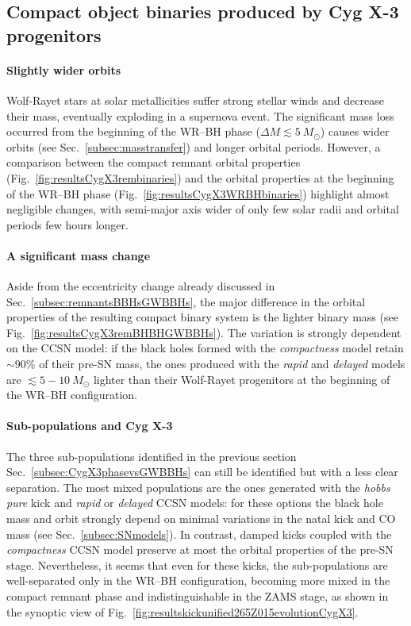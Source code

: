 \documentclass[a4paper,titlepage]{book}     	%
\newcommand{\sun}{\ensuremath{_\odot}}
\newcommand{\msun}{\ensuremath{M\sun}}
\begin{document}
\subsection{Compact object binaries produced by Cyg X-3 progenitors}\label{subsec:RemnantsCygX3vsGWBBHs}
\paragraph{Slightly wider orbits} Wolf-Rayet stars at solar metallicities suffer strong stellar winds and decrease their mass, eventually exploding in a supernova event. The significant mass loss occurred from the beginning of the WR--BH phase ($\Delta M \lesssim 5~\msun$) causes wider orbits (see Sec.\ \ref{subsec:masstransfer}) and longer orbital periods. However, a comparison between the compact remnant orbital properties (Fig.\ \ref{fig:resultsCygX3rembinaries}) and the orbital properties at the beginning of the WR--BH phase (Fig.\ \ref{fig:resultsCygX3WRBHbinaries}) highlight almost negligible changes, with semi-major axis wider of only few solar radii and orbital periods few hours longer. 



\paragraph{A significant mass change} Aside from the eccentricity change already discussed in Sec.\ \ref{subsec:remnantsBBHsGWBBHs}, the major difference in the orbital properties of the resulting compact binary system is the lighter binary mass (see Fig.\ \ref{fig:resultsCygX3remBHBHGWBBHs}). The variation is strongly dependent on the CCSN model: if the black holes formed with the \emph{compactness} model retain $\sim 90\%$ of their pre-SN mass, the ones produced with the \emph{rapid} and \emph{delayed} models are $\lesssim 5-10~\msun$ lighter than their Wolf-Rayet progenitors at the beginning of the WR--BH configuration.

\paragraph{Sub-populations and Cyg X-3} The three sub-populations identified in the previous section Sec.\ \ref{subsec:CygX3phasevsGWBBHs} can still be identified but with a less clear separation. The most mixed populations are the ones generated with the \emph{hobbs pure} kick and \emph{rapid} or \emph{delayed} CCSN models: for these options the black hole mass and orbit strongly depend on minimal variations in the natal kick and CO mass (see Sec.\ \ref{subsec:SNmodels}). In contrast, damped kicks coupled with the \emph{compactness} CCSN model preserve at most the orbital properties of the pre-SN stage. Nevertheless, it seems that even for these kicks, the sub-populations are well-separated only in the WR--BH configuration, becoming more mixed in the compact remnant phase and indistinguishable in the ZAMS stage, as shown in the synoptic view of Fig.\ \ref{fig:resultskickunified265Z015evolutionCygX3}.
\end{document}

